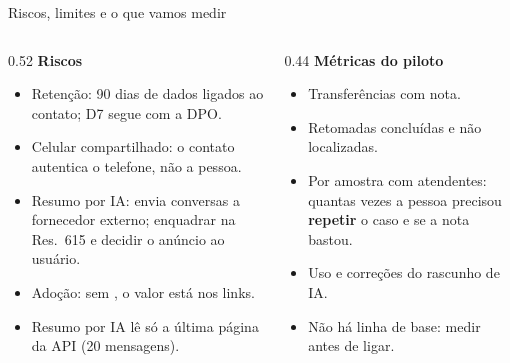 \documentclass[aspectratio=169,10pt]{beamer}
\newcommand{\code}[1]{\texttt{\detokenize{#1}}}
\begin{document}
\begin{frame}{Riscos, limites e o que vamos medir}
\begin{columns}[T]
\begin{column}{0.52\textwidth}
\textbf{Riscos}
\begin{itemize}\setlength\itemsep{3pt}\scriptsize
  \item \alert{Retenção:} 90 dias de dados ligados ao contato; D7 segue com a DPO.
  \item \alert{Celular compartilhado:} o contato autentica o telefone, não a pessoa.
  \item \alert{Resumo por IA:} envia conversas a fornecedor externo; enquadrar na Res.~615 e decidir o anúncio ao usuário.
  \item \alert{Adoção:} sem \code{/encerrar <resumo>}, o valor está nos links.
  \item Resumo por IA lê só a última página da API (20 mensagens).
\end{itemize}
\end{column}
\begin{column}{0.44\textwidth}
\textbf{Métricas do piloto}
\begin{itemize}\setlength\itemsep{3pt}\scriptsize
  \item Transferências com nota.
  \item Retomadas concluídas e não localizadas.
  \item Por amostra com atendentes: quantas vezes a pessoa precisou \textbf{repetir} o caso e se a nota bastou.
  \item Uso e correções do rascunho de IA.
  \item Não há linha de base: medir antes de ligar.
\end{itemize}
\end{column}
\end{columns}
\end{frame}
\end{document}
